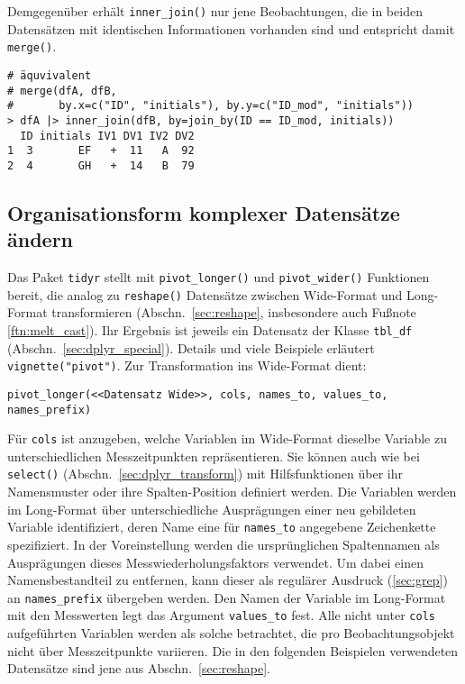 Demgegenüber erhält \lstinline!inner_join()! nur jene Beobachtungen, die in beiden Datensätzen mit identischen Informationen vorhanden sind und entspricht damit \lstinline!merge()!.
\begin{lstlisting}
# äquvivalent
# merge(dfA, dfB,
#       by.x=c("ID", "initials"), by.y=c("ID_mod", "initials"))
> dfA |> inner_join(dfB, by=join_by(ID == ID_mod, initials))
  ID initials IV1 DV1 IV2 DV2
1  3       EF   +  11   A  92
2  4       GH   +  14   B  79
\end{lstlisting}

\subsection{Organisationsform komplexer Datensätze ändern}
\label{sec:tidyr_reshape}

Das Paket \lstinline!tidyr! \cite{Wickham2014d} stellt mit \lstinline!pivot_longer()! und \lstinline!pivot_wider()! Funktionen bereit, die analog zu \lstinline!reshape()! Datensätze zwischen Wide-Format und Long-Format transformieren (Abschn.\ \ref{sec:reshape}, insbesondere auch Fußnote \ref{ftn:melt_cast}). Ihr Ergebnis ist jeweils ein Datensatz der Klasse \lstinline!tbl_df! (Abschn.\ \ref{sec:dplyr_special}). Details und viele Beispiele erläutert \lstinline!vignette("pivot")!. Zur Transformation ins Wide-Format dient:

\begin{lstlisting}
pivot_longer(<<Datensatz Wide>>, cols, names_to, values_to, names_prefix)
\end{lstlisting}
Für \lstinline!cols! ist anzugeben, welche Variablen im Wide-Format dieselbe Variable zu unterschiedlichen Messzeitpunkten repräsentieren. Sie können auch wie bei \lstinline!select()! (Abschn.\ \ref{sec:dplyr_transform}) mit Hilfsfunktionen über ihr Namensmuster oder ihre Spalten-Position definiert werden. Die Variablen werden im Long-Format über unterschiedliche Ausprägungen einer neu gebildeten Variable identifiziert, deren Name eine für \lstinline!names_to! angegebene Zeichenkette spezifiziert. In der Voreinstellung werden die ursprünglichen Spaltennamen als Ausprägungen dieses Messwiederholungsfaktors verwendet. Um dabei einen Namensbestandteil zu entfernen, kann dieser als regulärer Ausdruck (\ref{sec:grep}) an \lstinline!names_prefix! übergeben werden. Den Namen der Variable im Long-Format mit den Messwerten legt das Argument \lstinline!values_to! fest. Alle nicht unter \lstinline!cols! aufgeführten Variablen werden als solche betrachtet, die pro Beobachtungsobjekt nicht über Messzeitpunkte variieren. Die in den folgenden Beispielen verwendeten Datensätze sind jene aus Abschn.\ \ref{sec:reshape}.

